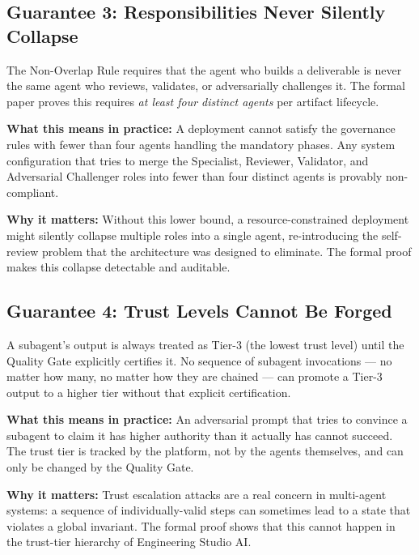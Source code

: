 \documentclass[12pt]{article}
\begin{document}
\subsection{Guarantee 3: Responsibilities Never Silently Collapse}

The Non-Overlap Rule requires that the agent who builds a deliverable
is never the same agent who reviews, validates, or adversarially
challenges it.
The formal paper proves this requires \emph{at least four distinct
agents} per artifact lifecycle.

\medskip
\noindent\textbf{What this means in practice:}
A deployment cannot satisfy the governance rules with fewer than four
agents handling the mandatory phases.
Any system configuration that tries to merge the Specialist, Reviewer,
Validator, and Adversarial Challenger roles into fewer than four
distinct agents is provably non-compliant.

\medskip
\noindent\textbf{Why it matters:}
Without this lower bound, a resource-constrained deployment might
silently collapse multiple roles into a single agent, re-introducing
the self-review problem that the architecture was designed to
eliminate.
The formal proof makes this collapse detectable and auditable.

\subsection{Guarantee 4: Trust Levels Cannot Be Forged}

A subagent's output is always treated as Tier-3 (the lowest trust
level) until the Quality Gate explicitly certifies it.
No sequence of subagent invocations --- no matter how many, no matter
how they are chained --- can promote a Tier-3 output to a higher tier
without that explicit certification.

\medskip
\noindent\textbf{What this means in practice:}
An adversarial prompt that tries to convince a subagent to claim
it has higher authority than it actually has cannot succeed.
The trust tier is tracked by the platform, not by the agents
themselves, and can only be changed by the Quality Gate.

\medskip
\noindent\textbf{Why it matters:}
Trust escalation attacks are a real concern in multi-agent systems:
a sequence of individually-valid steps can sometimes lead to a state
that violates a global invariant.
The formal proof shows that this cannot happen in the trust-tier
hierarchy of Engineering Studio AI.

\end{document}
